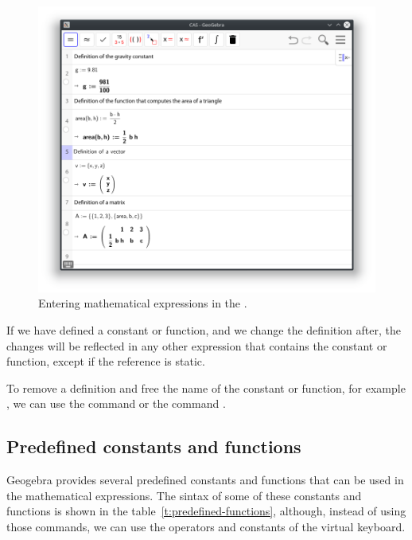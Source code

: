\begin{figure}[h!]
\begin{center}
\includegraphics[scale=0.6]{img/introduction/math-expressions}
\caption{Entering mathematical expressions in the .} \label{g:expressions}
\end{center}
\end{figure}


If we have defined a constant or function, and we change the definition after, the changes will be reflected in any other expression that contains the constant or function, except if the reference is static.

To remove a definition and free the name of the constant or function, for example , we can use the command  or the command .


\subsection*{Predefined constants and functions}
Geogebra provides several predefined constants and functions that can be used in the mathematical expressions.
The sintax of some of these constants and functions is shown in the table~\ref{t:predefined-functions}, although, instead of using those commands, we can use the operators and constants of the virtual keyboard.

